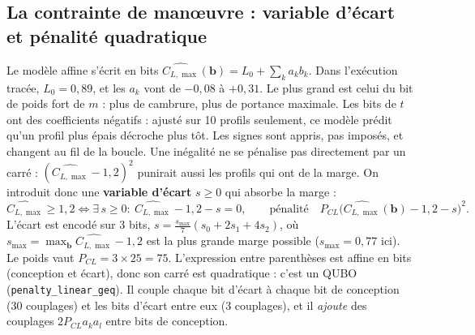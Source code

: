 \subsection{La contrainte de manœuvre : variable d'écart et pénalité quadratique}
Le modèle affine s'écrit en bits $\widehat{C_{L,\max}}(\mathbf b)=L_0+\sum_ka_kb_k$. Dans l'exécution tracée, $L_0=0{,}89$, et les $a_k$ vont de $-0{,}08$ à $+0{,}31$. Le plus grand est celui du bit de poids fort de $m$ : plus de cambrure, plus de portance maximale. Les bits de $t$ ont des coefficients négatifs : ajusté sur 10 profils seulement, ce modèle prédit qu'un profil plus épais décroche plus tôt. Les signes sont appris, pas imposés, et changent au fil de la boucle. Une inégalité ne se pénalise pas directement par un carré : $(\widehat{C_{L,\max}}-1{,}2)^2$ punirait aussi les profils qui ont de la marge. On introduit donc une \textbf{variable d'écart} $s\ge0$ qui absorbe la marge :
\[ \widehat{C_{L,\max}}\ge1{,}2\iff\exists\,s\ge0:\ \widehat{C_{L,\max}}-1{,}2-s=0,\qquad\text{pénalité}\quad P_{CL}\big(\widehat{C_{L,\max}}(\mathbf b)-1{,}2-s\big)^2. \]
L'écart est encodé sur 3 bits, $s=\frac{s_{\max}}{7}(s_0+2s_1+4s_2)$, où $s_{\max}=\max_{\mathbf b}\widehat{C_{L,\max}}-1{,}2$ est la plus grande marge possible ($s_{\max}=0{,}77$ ici). Le poids vaut $P_{CL}=3\times25=75$. L'expression entre parenthèses est affine en bits (conception et écart), donc son carré est quadratique : c'est un QUBO (\texttt{penalty\_linear\_geq}). Il couple chaque bit d'écart à chaque bit de conception (30 couplages) et les bits d'écart entre eux (3 couplages), et il \emph{ajoute} des couplages $2P_{CL}a_ka_l$ entre bits de conception.

